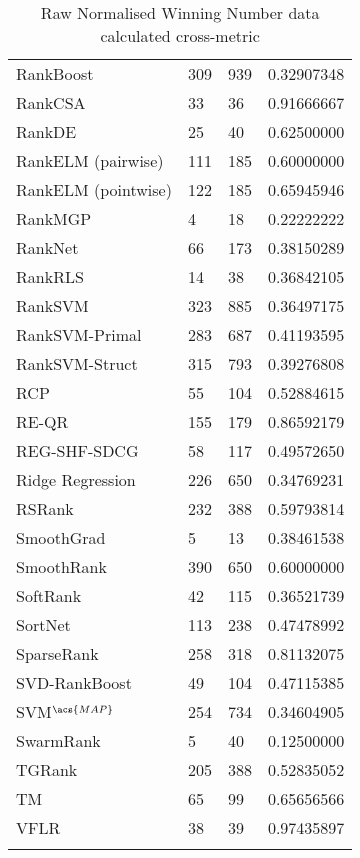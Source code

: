 \begin{longtable}{l|l|l|l}
RankBoost & 309 & 939 & 0.32907348 \\ 
RankCSA & 33 & 36 & 0.91666667 \\ 
RankDE & 25 & 40 & 0.62500000 \\ 
RankELM (pairwise) & 111 & 185 & 0.60000000 \\ 
RankELM (pointwise) & 122 & 185 & 0.65945946 \\ 
RankMGP & 4 & 18 & 0.22222222 \\ 
RankNet & 66 & 173 & 0.38150289 \\ 
Rank\acs{RLS} & 14 & 38 & 0.36842105 \\ 
Rank\acs{SVM} & 323 & 885 & 0.36497175 \\ 
Rank\acs{SVM}-Primal & 283 & 687 & 0.41193595 \\ 
Rank\acs{SVM}-Struct & 315 & 793 & 0.39276808 \\ 
RCP & 55 & 104 & 0.52884615 \\ 
RE-QR & 155 & 179 & 0.86592179 \\ 
REG-SHF-SDCG & 58 & 117 & 0.49572650 \\ 
Ridge Regression & 226 & 650 & 0.34769231 \\ 
RSRank & 232 & 388 & 0.59793814 \\ 
SmoothGrad & 5 & 13 & 0.38461538 \\ 
SmoothRank & 390 & 650 & 0.60000000 \\ 
SoftRank & 42 & 115 & 0.36521739 \\ 
SortNet & 113 & 238 & 0.47478992 \\ 
SparseRank & 258 & 318 & 0.81132075 \\ 
\acs{SVD}-RankBoost & 49 & 104 & 0.47115385 \\ 
\acs{SVM}$^{\acs{MAP}}$ & 254 & 734 & 0.34604905 \\ 
SwarmRank & 5 & 40 & 0.12500000 \\ 
TGRank & 205 & 388 & 0.52835052 \\ 
TM & 65 & 99 & 0.65656566 \\ 
VFLR & 38 & 39 & 0.97435897 \\
\caption{Raw Normalised Winning Number data calculated cross-metric}
\label{tab:raw_data_norm_winnum_all}
\end{longtable}
